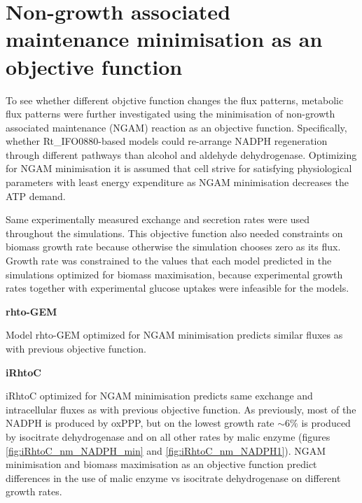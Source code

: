 \section{Non-growth associated maintenance minimisation as an objective function}

To see whether different objctive function changes the flux patterns, metabolic flux patterns were further investigated using the minimisation of non-growth associated maintenance (NGAM) reaction as an objective function. 
Specifically, whether Rt\_IFO0880-based models could re-arrange NADPH regeneration through different pathways than alcohol and aldehyde dehydrogenase. Optimizing for NGAM minimisation it is assumed that cell strive for satisfying physiological parameters with least energy expenditure as NGAM minimisation decreases the ATP demand.

Same experimentally measured exchange and secretion rates were used throughout the simulations. This objective function also needed constraints 
on biomass growth rate because otherwise the simulation chooses zero as its flux. 
Growth rate was constrained to the values that each model
predicted in the simulations optimized for biomass maximisation, because experimental growth rates together with experimental glucose 
uptakes were infeasible for the models. 

\textbf{rhto-GEM}

Model rhto-GEM optimized for NGAM minimisation predicts similar fluxes as with 
previous objective function. 

\textbf{iRhtoC}

iRhtoC optimized for NGAM minimisation predicts same exchange and intracellular fluxes as with 
previous objective function. 
As previously, most of the NADPH is produced by oxPPP, but on the lowest growth rate $\sim 6\%$ is produced by isocitrate dehydrogenase and on all other 
rates by malic enzyme (figures \ref{fig:iRhtoC_nm_NADPH_min} and \ref{fig:iRhtoC_nm_NADPH1}). NGAM minimisation and biomass maximisation as an objective 
function predict differences in the use of malic enzyme vs isocitrate dehydrogenase on different growth rates.

